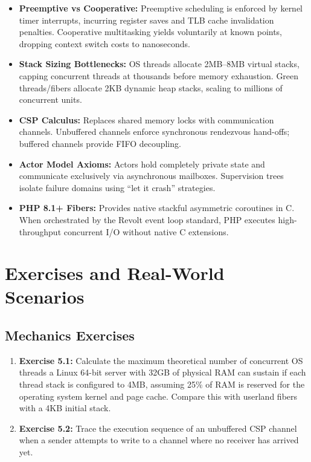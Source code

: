 \begin{itemize}[leftmargin=15pt]
  \item \textbf{Preemptive vs Cooperative:} Preemptive scheduling is enforced by kernel timer interrupts, incurring register saves and TLB cache invalidation penalties. Cooperative multitasking yields voluntarily at known points, dropping context switch costs to nanoseconds.
  \item \textbf{Stack Sizing Bottlenecks:} OS threads allocate 2MB--8MB virtual stacks, capping concurrent threads at thousands before memory exhaustion. Green threads/fibers allocate 2KB dynamic heap stacks, scaling to millions of concurrent units.
  \item \textbf{CSP Calculus:} Replaces shared memory locks with communication channels. Unbuffered channels enforce synchronous rendezvous hand-offs; buffered channels provide FIFO decoupling.
  \item \textbf{Actor Model Axioms:} Actors hold completely private state and communicate exclusively via asynchronous mailboxes. Supervision trees isolate failure domains using ``let it crash'' strategies.
  \item \textbf{PHP 8.1+ Fibers:} Provides native stackful asymmetric coroutines in C. When orchestrated by the Revolt event loop standard, PHP executes high-throughput concurrent I/O without native C extensions.
\end{itemize}

\section{Exercises and Real-World Scenarios}

\subsection{Mechanics Exercises}
\begin{enumerate}
  \item \textbf{Exercise 5.1:} Calculate the maximum theoretical number of concurrent OS threads a Linux 64-bit server with 32GB of physical RAM can sustain if each thread stack is configured to 4MB, assuming 25\% of RAM is reserved for the operating system kernel and page cache. Compare this with userland fibers with a 4KB initial stack.
  \item \textbf{Exercise 5.2:} Trace the execution sequence of an unbuffered CSP channel when a sender attempts to write to a channel where no receiver has arrived yet.
\end{enumerate}


